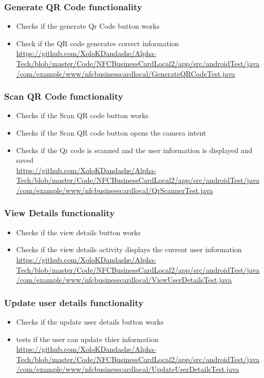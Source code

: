 \documentclass[english]{article}
\begin{document}
		\subsubsection{Generate QR Code functionality}
			\begin{itemize} 
				\item Checks if the generate Qr Code button works
				\item Check if the QR code generates correct information
				\\
					\href{url}{https://github.com/XoloKDandashe/Alpha-Tech/blob/master/Code/NFCBusinessCardLocal2/app/src/androidTest/java/com/example/www/nfcbusinesscardlocal/GenerateQRCodeTest.java}

			\end{itemize}
	\subsubsection{Scan QR Code functionality}
			\begin{itemize} 
				\item Checks if the Scan QR code button works
				\item Checks if the Scan QR code button opens the camera intent
				\item Checks if the Qr code is scanned and the user information is displayed and saved
\\
					\href{url}{https://github.com/XoloKDandashe/Alpha-Tech/blob/master/Code/NFCBusinessCardLocal2/app/src/androidTest/java/com/example/www/nfcbusinesscardlocal/QrScannerTest.java}
			\end{itemize}
		\subsubsection{View Details functionality}
			\begin{itemize} 
				\item Checks if the view details button works
				\item Checks if the view details activity displays the current user information
\\
					\href{url}{https://github.com/XoloKDandashe/Alpha-Tech/blob/master/Code/NFCBusinessCardLocal2/app/src/androidTest/java/com/example/www/nfcbusinesscardlocal/ViewUserDetailsTest.java}
			\end{itemize}
		\subsubsection{Update user details functionality}
			\begin{itemize} 
				\item Checks if the update user details button works
				\item tests if the user can update thier information
\\
					\href{url}{https://github.com/XoloKDandashe/Alpha-Tech/blob/master/Code/NFCBusinessCardLocal2/app/src/androidTest/java/com/example/www/nfcbusinesscardlocal/UpdateUserDetailsTest.java}
			\end{itemize}
\end{document}
